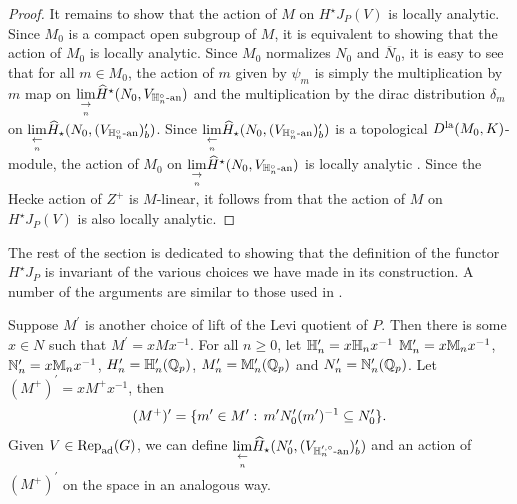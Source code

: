 \documentclass[10pt]{amsart}
\begin{document}
\begin{proof}
It remains to show that the action of $M$ on $H^{\star}J_{P}(V)$ is locally analytic. Since $M_{0}$ is a compact open subgroup of $M$, it is equivalent to showing that the action of $M_{0}$ is locally analytic. Since $M_{0}$ normalizes $N_{0}$ and $\overline{N}_{0}$, it is easy to see that for all $m\in M_{0}$, the action of $m$ given by $\psi_{m}$ is simply the multiplication by $m$ map on $\underset{\underset{n}{\rightarrow}}{\lim} \widehat{H}^{\star}(N_{0},V_{\mathbb{H}_{n}^{\circ}\textnormal{-an}})$ and the multiplication by the dirac distribution $\delta_{m}$ on $\underset{\underset{n}{\leftarrow}}{\lim} \widehat{H}_{\star}(N_{0},(V_{\mathbb{H}_{n}^{\circ}\textnormal{-an}})^{\prime}_{b})$. Since $\underset{\underset{n}{\leftarrow}}{\lim} \widehat{H}_{\star}(N_{0},(V_{\mathbb{H}_{n}^{\circ}\textnormal{-an}})^{\prime}_{b})$ is a topological $D^{\textnormal{la}}(M_{0},K)$-module, the action of $M_{0}$ on $\underset{\underset{n}{\rightarrow}}{\lim} \widehat{H}^{\star}(N_{0},V_{\mathbb{H}_{n}^{\circ}\textnormal{-an}})$ is locally analytic \cite[Prop. 2.2]{summary}. Since the Hecke action of $Z^{+}$ is $M$-linear, it follows from \cite[Lem. 3.2.7]{Jacquet1} that the action of $M$ on $H^{\star}J_{P}(V)$ is also locally analytic. 
\end{proof}

The rest of the section is dedicated to showing that the definition of the functor $H^{\star}J_{P}$ is invariant of the various choices we have made in its construction. A number of the arguments are similar to those used in \cite{Jacquet1}.

Suppose $M^{\prime}$ is another choice of lift of the Levi quotient of $P$. Then there is some $x\in N$ such that $M^{\prime}=xMx^{-1}$. For all $n\geq0$, let $\mathbb{H}_{n}^{\prime}=x\mathbb{H}_{n}x^{-1}$ $\mathbb{M}_{n}^{\prime}=x\mathbb{M}_{n}x^{-1}$, $\mathbb{N}_{n}^{\prime}=x\mathbb{M}_{n}x^{-1}$, $H_{n}^{\prime}=\mathbb{H}_{n}^{\prime}(\mathbb{Q}_{p})$, $M_{n}^{\prime}=\mathbb{M}_{n}^{\prime}(\mathbb{Q}_{p})$ and $N_{n}^{\prime}=\mathbb{N}_{n}^{\prime}(\mathbb{Q}_{p})$. Let $(M^{+})^{\prime}=xM^{+}x^{-1}$, then \begin{equation*}
    (M^{+})^{\prime} = \{ m^{\prime}\in M^{\prime}:\, m^{\prime}N_{0}^{\prime}(m^{\prime})^{-1}\subseteq N_{0}^{\prime}\}. 
\end{equation*} Given $V\in \textnormal{Rep}_{\textnormal{ad}}(G)$, we can define $\underset{\underset{n}{\leftarrow}}{\lim} \widehat{H}_{\star}(N^{\prime}_{0},(V_{\mathbb{H}_{n}^{\prime,\circ}\textnormal{-an}})^{\prime}_{b})$ and an action of $(M^{+})^{\prime}$ on the space in an analogous way. 
\end{document}
